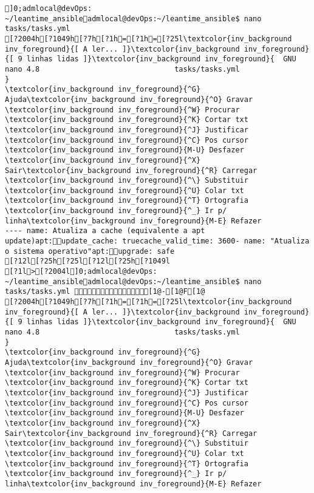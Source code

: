 \documentclass{scrartcl}
\title{}
\begin{document}
\begin{Verbatim}
]0;admlocal@devOps: ~/leantime_ansibleadmlocal@devOps:~/leantime_ansible$ nano tasks/tasks.yml 
[?2004h[?1049h[?7h[?1h=[?1h=[?25l\textcolor{inv_background inv_foreground}{[ A ler... ]}\textcolor{inv_background inv_foreground}{[ 9 linhas lidas ]}\textcolor{inv_background inv_foreground}{  GNU nano 4.8                               tasks/tasks.yml                                            }
\textcolor{inv_background inv_foreground}{^G} Ajuda\textcolor{inv_background inv_foreground}{^O} Gravar     \textcolor{inv_background inv_foreground}{^W} Procurar   \textcolor{inv_background inv_foreground}{^K} Cortar txt \textcolor{inv_background inv_foreground}{^J} Justificar \textcolor{inv_background inv_foreground}{^C} Pos cursor \textcolor{inv_background inv_foreground}{M-U} Desfazer
\textcolor{inv_background inv_foreground}{^X} Sair\textcolor{inv_background inv_foreground}{^R} Carregar   \textcolor{inv_background inv_foreground}{^\} Substituir \textcolor{inv_background inv_foreground}{^U} Colar txt  \textcolor{inv_background inv_foreground}{^T} Ortografia \textcolor{inv_background inv_foreground}{^_} Ir p/ linha\textcolor{inv_background inv_foreground}{M-E} Refazer
---- name: Atualiza a cache (equivalente a apt update)apt:update_cache: truecache_valid_time: 3600- name: "Atualiza o sistema operativo"apt:upgrade: safe
[?12l[?25h[?25l[?12l[?25h[?1049l
[?1l>[?2004l]0;admlocal@devOps: ~/leantime_ansibleadmlocal@devOps:~/leantime_ansible$ nano tasks/tasks.yml [1@-[1@F[1@ 
[?2004h[?1049h[?7h[?1h=[?1h=[?25l\textcolor{inv_background inv_foreground}{[ A ler... ]}\textcolor{inv_background inv_foreground}{[ 9 linhas lidas ]}\textcolor{inv_background inv_foreground}{  GNU nano 4.8                               tasks/tasks.yml                                            }
\textcolor{inv_background inv_foreground}{^G} Ajuda\textcolor{inv_background inv_foreground}{^O} Gravar     \textcolor{inv_background inv_foreground}{^W} Procurar   \textcolor{inv_background inv_foreground}{^K} Cortar txt \textcolor{inv_background inv_foreground}{^J} Justificar \textcolor{inv_background inv_foreground}{^C} Pos cursor \textcolor{inv_background inv_foreground}{M-U} Desfazer
\textcolor{inv_background inv_foreground}{^X} Sair\textcolor{inv_background inv_foreground}{^R} Carregar   \textcolor{inv_background inv_foreground}{^\} Substituir \textcolor{inv_background inv_foreground}{^U} Colar txt  \textcolor{inv_background inv_foreground}{^T} Ortografia \textcolor{inv_background inv_foreground}{^_} Ir p/ linha\textcolor{inv_background inv_foreground}{M-E} Refazer

\end{Verbatim}
\end{document}
